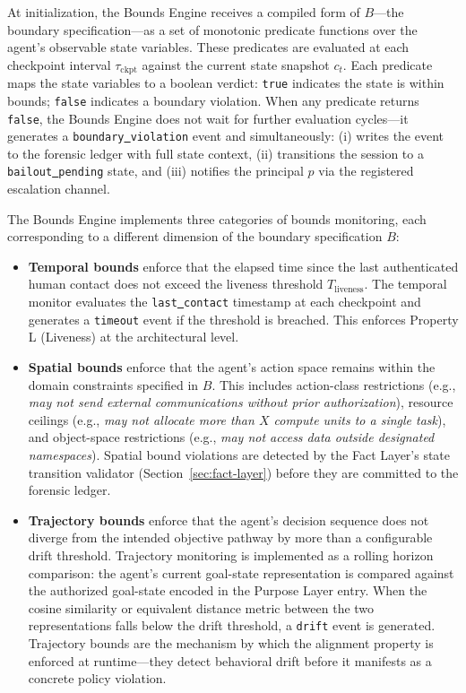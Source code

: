 At initialization, the Bounds Engine receives a compiled form of $B$—the boundary specification—as a set of monotonic predicate functions over the agent's observable state variables. These predicates are evaluated at each checkpoint interval $\tau_{\text{ckpt}}$ against the current state snapshot $c_t$. Each predicate maps the state variables to a boolean verdict: \texttt{true} indicates the state is within bounds; \texttt{false} indicates a boundary violation. When any predicate returns \texttt{false}, the Bounds Engine does not wait for further evaluation cycles—it generates a \texttt{boundary\underline{ }violation} event and simultaneously: (i) writes the event to the forensic ledger with full state context, (ii) transitions the session to a \texttt{bailout\underline{ }pending} state, and (iii) notifies the principal $p$ via the registered escalation channel.

The Bounds Engine implements three categories of bounds monitoring, each corresponding to a different dimension of the boundary specification $B$:

\begin{itemize}
    \item \textbf{Temporal bounds} enforce that the elapsed time since the last authenticated human contact does not exceed the liveness threshold $T_{\text{liveness}}$. The temporal monitor evaluates the \texttt{last\underline{ }contact} timestamp at each checkpoint and generates a \texttt{timeout} event if the threshold is breached. This enforces Property L (Liveness) at the architectural level.
    \item \textbf{Spatial bounds} enforce that the agent's action space remains within the domain constraints specified in $B$. This includes action-class restrictions (e.g., \emph{may not send external communications without prior authorization}), resource ceilings (e.g., \emph{may not allocate more than $X$ compute units to a single task}), and object-space restrictions (e.g., \emph{may not access data outside designated namespaces}). Spatial bound violations are detected by the Fact Layer's state transition validator (Section~\ref{sec:fact-layer}) before they are committed to the forensic ledger.
    \item \textbf{Trajectory bounds} enforce that the agent's decision sequence does not diverge from the intended objective pathway by more than a configurable drift threshold. Trajectory monitoring is implemented as a rolling horizon comparison: the agent's current goal-state representation is compared against the authorized goal-state encoded in the Purpose Layer entry. When the cosine similarity or equivalent distance metric between the two representations falls below the drift threshold, a \texttt{drift} event is generated. Trajectory bounds are the mechanism by which the alignment property is enforced at runtime—they detect behavioral drift before it manifests as a concrete policy violation.
\end{itemize}

